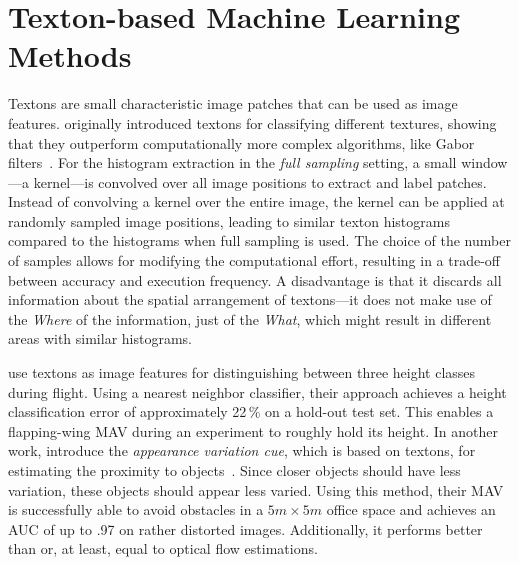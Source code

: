 \section{Texton-based Machine Learning Methods}
\label{sec:textonbasedapproaches}

Textons are small characteristic image patches that can be used as image features.
\citet{varma2005statistical} originally introduced textons for
classifying different textures, showing that they outperform
computationally more complex algorithms, like Gabor
filters~\cite{varma2005statistical}. For the histogram extraction in the \emph{full sampling} setting, a small window---a kernel---is convolved over all image positions to extract and label patches.
Instead of convolving a kernel over the entire image, the kernel can be applied at randomly sampled image positions, leading to similar texton histograms compared to the histograms when full sampling is used. The choice of the number of samples allows for modifying the computational effort, resulting in a
trade-off between accuracy and execution frequency. A disadvantage is
that it discards all information about the spatial arrangement of
textons---it does not make use of the \emph{Where} of the information,
just of the \emph{What}, which might result in different areas with
similar histograms.

\citet{de2009design} use textons as image features for distinguishing
between three height classes during flight. Using
a nearest neighbor classifier, their approach achieves a height
classification error of approximately 22\,\% on a hold-out test set.
This enables a flapping-wing MAV during an experiment to roughly hold
its height. In another work, \citet{de2012appearance} introduce
the \emph{appearance variation cue}, which is based on textons, for estimating the proximity to
objects~\cite{de2012appearance}. Since closer objects should have less
variation, these objects should appear less varied. Using this method,
their MAV is successfully able to avoid obstacles in a $5m \times 5m$
office space and achieves an AUC of up to .97 on rather distorted
images. Additionally, it performs better than or, at least, equal to
optical flow estimations.